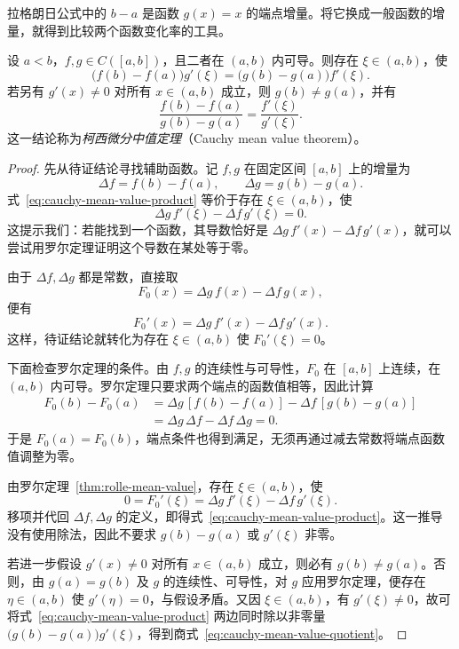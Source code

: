 拉格朗日公式中的 $b-a$ 是函数 $g(x)=x$ 的端点增量。将它换成一般函数的增量，就得到比较两个函数变化率的工具。

\begin{theorem}[柯西微分中值定理]
\label{thm:cauchy-mean-value}
设 $a<b$，$f,g\in C([a,b])$，且二者在 $(a,b)$ 内可导。则存在 $\xi\in(a,b)$，使
\begin{equation}
    \bigl(f(b)-f(a)\bigr)g'(\xi)
    =\bigl(g(b)-g(a)\bigr)f'(\xi).
    \label{eq:cauchy-mean-value-product}
\end{equation}
若另有 $g'(x)\neq0$ 对所有 $x\in(a,b)$ 成立，则 $g(b)\neq g(a)$，并有
\begin{equation}
    \frac{f(b)-f(a)}{g(b)-g(a)}=\frac{f'(\xi)}{g'(\xi)}.
    \label{eq:cauchy-mean-value-quotient}
\end{equation}
这一结论称为\emph{柯西微分中值定理}（Cauchy mean value theorem）。
\end{theorem}

\begin{proof}
先从待证结论寻找辅助函数。记 $f,g$ 在固定区间 $[a,b]$ 上的增量为
\[
    \Delta f=f(b)-f(a),\qquad \Delta g=g(b)-g(a).
\]
式~\eqref{eq:cauchy-mean-value-product} 等价于存在 $\xi\in(a,b)$，使
\[
    \Delta g\,f'(\xi)-\Delta f\,g'(\xi)=0.
\]
这提示我们：若能找到一个函数，其导数恰好是 $\Delta g\,f'(x)-\Delta f\,g'(x)$，就可以尝试用罗尔定理证明这个导数在某处等于零。

由于 $\Delta f,\Delta g$ 都是常数，直接取
\[
    F_0(x)=\Delta g\,f(x)-\Delta f\,g(x),
\]
便有
\[
    F_0'(x)=\Delta g\,f'(x)-\Delta f\,g'(x).
\]
这样，待证结论就转化为存在 $\xi\in(a,b)$ 使 $F_0'(\xi)=0$。

下面检查罗尔定理的条件。由 $f,g$ 的连续性与可导性，$F_0$ 在 $[a,b]$ 上连续，在 $(a,b)$ 内可导。罗尔定理只要求两个端点的函数值相等，因此计算
\[
    \begin{aligned}
        F_0(b)-F_0(a)
        &=\Delta g\,[f(b)-f(a)]-\Delta f\,[g(b)-g(a)]\\
        &=\Delta g\,\Delta f-\Delta f\,\Delta g=0.
    \end{aligned}
\]
于是 $F_0(a)=F_0(b)$，端点条件也得到满足，无须再通过减去常数将端点函数值调整为零。

由罗尔定理~\ref{thm:rolle-mean-value}，存在 $\xi\in(a,b)$，使
\[
    0=F_0'(\xi)=\Delta g\,f'(\xi)-\Delta f\,g'(\xi).
\]
移项并代回 $\Delta f,\Delta g$ 的定义，即得式~\eqref{eq:cauchy-mean-value-product}。这一推导没有使用除法，因此不要求 $g(b)-g(a)$ 或 $g'(\xi)$ 非零。

若进一步假设 $g'(x)\neq0$ 对所有 $x\in(a,b)$ 成立，则必有 $g(b)\neq g(a)$。否则，由 $g(a)=g(b)$ 及 $g$ 的连续性、可导性，对 $g$ 应用罗尔定理，便存在 $\eta\in(a,b)$ 使 $g'(\eta)=0$，与假设矛盾。又因 $\xi\in(a,b)$，有 $g'(\xi)\neq0$，故可将式~\eqref{eq:cauchy-mean-value-product} 两边同时除以非零量 $\bigl(g(b)-g(a)\bigr)g'(\xi)$，得到商式~\eqref{eq:cauchy-mean-value-quotient}。
\end{proof}

